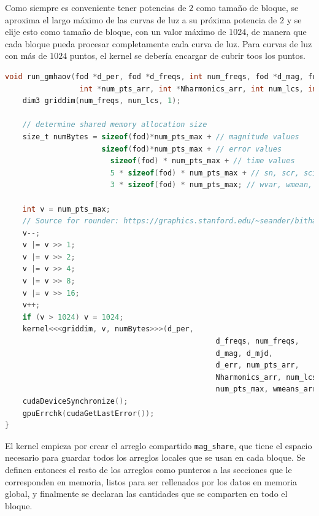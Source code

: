 Como siempre es conveniente tener potencias de $2$ como tamaño de bloque, se aproxima el largo máximo de las curvas de luz a su próxima potencia de $2$ y se elije esto como tamaño de bloque, con un valor máximo de $1024$, de manera que cada bloque pueda procesar completamente cada curva de luz. Para curvas de luz con más de $1024$ puntos, el kernel se debería encargar de cubrir toos los puntos.
\begin{lstlisting}[language=C]
void run_gmhaov(fod *d_per, fod *d_freqs, int num_freqs, fod *d_mag, fod *d_mjd, fod *d_err,
                 int *num_pts_arr, int *Nharmonics_arr, int num_lcs, int num_pts_max, float *wmeans_arr, float *wvars_arr){
    dim3 griddim(num_freqs, num_lcs, 1); 

    // determine shared memory allocation size
    size_t numBytes = sizeof(fod)*num_pts_max + // magnitude values
                      sizeof(fod)*num_pts_max + // error values
                        sizeof(fod) * num_pts_max + // time values
                        5 * sizeof(fod) * num_pts_max + // sn, scr, sci, alr, ali to sum
                        3 * sizeof(fod) * num_pts_max; // wvar, wmean, w_sum to sum

    int v = num_pts_max;
    // Source for rounder: https://graphics.stanford.edu/~seander/bithacks.html#RoundUpPowerOf2
    v--;
    v |= v >> 1;
    v |= v >> 2;
    v |= v >> 4;
    v |= v >> 8;
    v |= v >> 16;
    v++;
    if (v > 1024) v = 1024;
    kernel<<<griddim, v, numBytes>>>(d_per,
                                                d_freqs, num_freqs,
                                                d_mag, d_mjd,
                                                d_err, num_pts_arr,
                                                Nharmonics_arr, num_lcs,
                                                num_pts_max, wmeans_arr, wvars_arr);
    cudaDeviceSynchronize();
    gpuErrchk(cudaGetLastError());
}
\end{lstlisting}

El kernel empieza por crear el arreglo compartido \texttt{mag\_share}, que tiene el espacio necesario para guardar todos los arreglos locales que se usan en cada bloque. Se definen entonces el resto de los arreglos como punteros a las secciones que le corresponden en memoria, listos para ser rellenados por los datos en memoria global, y finalmente se declaran las cantidades que se comparten en todo el bloque.


